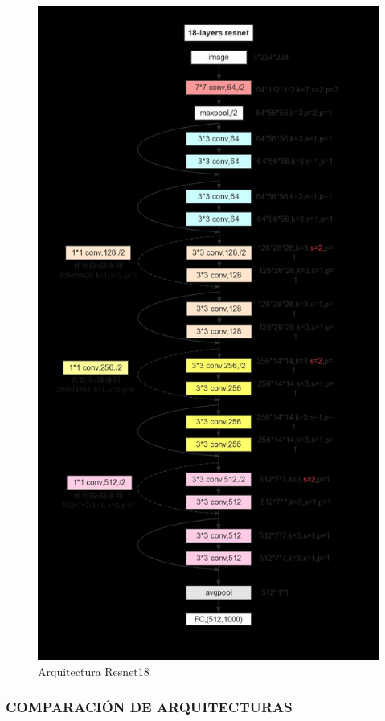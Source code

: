 				\begin{figure}[ht]
					\centering
					\includegraphics[scale=0.25]{Figs/69.png}
					\caption{Arquitectura Resnet18}
					\label{fig:RESNET18}
				\end{figure}
			
			
			\subsubsection{\MakeUppercase{Comparación de arquitecturas}}
\newpage		
